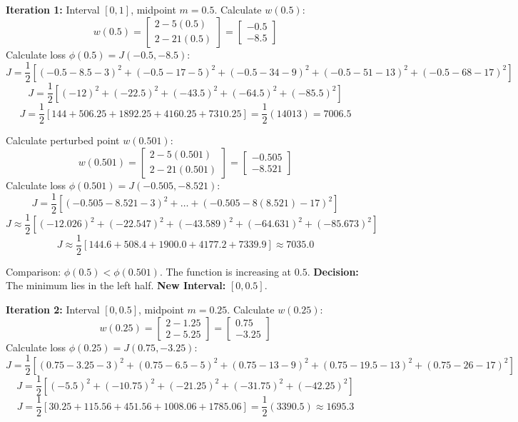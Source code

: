 \documentclass{article}
\begin{document}
\textbf{Iteration 1:}
Interval $[0, 1]$, midpoint $m = 0.5$.
Calculate $w(0.5)$:
$$ w(0.5) = \begin{bmatrix} 2 - 5(0.5) \\ 2 - 21(0.5) \end{bmatrix} = \begin{bmatrix} -0.5 \\ -8.5 \end{bmatrix} $$
Calculate loss $\phi(0.5) = J(-0.5, -8.5)$:
$$ J = \frac{1}{2} \left[ (-0.5 - 8.5 - 3)^2 + (-0.5 - 17 - 5)^2 + (-0.5 - 34 - 9)^2 + (-0.5 - 51 - 13)^2 + (-0.5 - 68 - 17)^2 \right] $$
$$ J = \frac{1}{2} \left[ (-12)^2 + (-22.5)^2 + (-43.5)^2 + (-64.5)^2 + (-85.5)^2 \right] $$
$$ J = \frac{1}{2} \left[ 144 + 506.25 + 1892.25 + 4160.25 + 7310.25 \right] = \frac{1}{2} (14013) = 7006.5 $$

Calculate perturbed point $w(0.501)$:
$$ w(0.501) = \begin{bmatrix} 2 - 5(0.501) \\ 2 - 21(0.501) \end{bmatrix} = \begin{bmatrix} -0.505 \\ -8.521 \end{bmatrix} $$
Calculate loss $\phi(0.501) = J(-0.505, -8.521)$:
$$ J = \frac{1}{2} \left[ (-0.505 - 8.521 - 3)^2 + \dots + (-0.505 - 8(8.521) - 17)^2 \right] $$
$$ J \approx \frac{1}{2} \left[ (-12.026)^2 + (-22.547)^2 + (-43.589)^2 + (-64.631)^2 + (-85.673)^2 \right] $$
$$ J \approx \frac{1}{2} \left[ 144.6 + 508.4 + 1900.0 + 4177.2 + 7339.9 \right] \approx 7035.0 $$

Comparison: $\phi(0.5) < \phi(0.501)$. The function is increasing at $0.5$.
\textbf{Decision:} The minimum lies in the left half.
\textbf{New Interval:} $[0, 0.5]$.

\textbf{Iteration 2:}
Interval $[0, 0.5]$, midpoint $m = 0.25$.
Calculate $w(0.25)$:
$$ w(0.25) = \begin{bmatrix} 2 - 1.25 \\ 2 - 5.25 \end{bmatrix} = \begin{bmatrix} 0.75 \\ -3.25 \end{bmatrix} $$
Calculate loss $\phi(0.25) = J(0.75, -3.25)$:
$$ J = \frac{1}{2} \left[ (0.75 - 3.25 - 3)^2 + (0.75 - 6.5 - 5)^2 + (0.75 - 13 - 9)^2 + (0.75 - 19.5 - 13)^2 + (0.75 - 26 - 17)^2 \right] $$
$$ J = \frac{1}{2} \left[ (-5.5)^2 + (-10.75)^2 + (-21.25)^2 + (-31.75)^2 + (-42.25)^2 \right] $$
$$ J = \frac{1}{2} \left[ 30.25 + 115.56 + 451.56 + 1008.06 + 1785.06 \right] = \frac{1}{2} (3390.5) \approx 1695.3 $$
\end{document}
